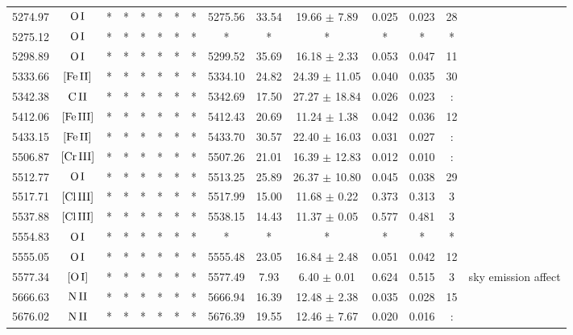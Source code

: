 \documentclass{article}
\begin{document}
\begin{table*}
\begin{adjustbox}{width=\textwidth}
\begin{tabular}{ccccccccccccccc}
5274.97 & $\mbox{O}\thinspace \mbox{I}$ & * & * & * & * & * & * & 5275.56 & 33.54 & 19.66 $\pm$ 7.89 & 0.025 & 0.023 & 28 &  \\
5275.12 & $\mbox{O}\thinspace \mbox{I}$ & * & * & * & * & * & * & * & * & * & * & * & * &  \\
5298.89 & $\mbox{O}\thinspace \mbox{I}$ & * & * & * & * & * & * & 5299.52 & 35.69 & 16.18 $\pm$ 2.33 & 0.053 & 0.047 & 11 &  \\
5333.66 & $\mbox{[Fe}\thinspace \mbox{II]}$ & * & * & * & * & * & * & 5334.10 & 24.82 & 24.39 $\pm$ 11.05 & 0.040 & 0.035 & 30 &  \\
5342.38 & $\mbox{C}\thinspace \mbox{II}$ & * & * & * & * & * & * & 5342.69 & 17.50 & 27.27 $\pm$ 18.84 & 0.026 & 0.023 & : &  \\
5412.06 & $\mbox{[Fe}\thinspace \mbox{III]}$ & * & * & * & * & * & * & 5412.43 & 20.69 & 11.24 $\pm$ 1.38 & 0.042 & 0.036 & 12 &  \\
5433.15 & $\mbox{[Fe}\thinspace \mbox{II]}$ & * & * & * & * & * & * & 5433.70 & 30.57 & 22.40 $\pm$ 16.03 & 0.031 & 0.027 & : &  \\
5506.87 & $\mbox{[Cr}\thinspace \mbox{III]}$ & * & * & * & * & * & * & 5507.26 & 21.01 & 16.39 $\pm$ 12.83 & 0.012 & 0.010 & : &  \\
5512.77 & $\mbox{O}\thinspace \mbox{I}$ & * & * & * & * & * & * & 5513.25 & 25.89 & 26.37 $\pm$ 10.80 & 0.045 & 0.038 & 29 &  \\
5517.71 & $\mbox{[Cl}\thinspace \mbox{III]}$ & * & * & * & * & * & * & 5517.99 & 15.00 & 11.68 $\pm$ 0.22 & 0.373 & 0.313 & 3 &  \\
5537.88 & $\mbox{[Cl}\thinspace \mbox{III]}$ & * & * & * & * & * & * & 5538.15 & 14.43 & 11.37 $\pm$ 0.05 & 0.577 & 0.481 & 3 &  \\
5554.83 & $\mbox{O}\thinspace \mbox{I}$ & * & * & * & * & * & * & * & * & * & * & * & * &  \\
5555.05 & $\mbox{O}\thinspace \mbox{I}$ & * & * & * & * & * & * & 5555.48 & 23.05 & 16.84 $\pm$ 2.48 & 0.051 & 0.042 & 12 &  \\
5577.34 & $\mbox{[O}\thinspace \mbox{I]}$ & * & * & * & * & * & * & 5577.49 & 7.93 & 6.40 $\pm$ 0.01 & 0.624 & 0.515 & 3 &  sky emission affect \\
5666.63 & $\mbox{N}\thinspace \mbox{II}$ & * & * & * & * & * & * & 5666.94 & 16.39 & 12.48 $\pm$ 2.38 & 0.035 & 0.028 & 15 &  \\
5676.02 & $\mbox{N}\thinspace \mbox{II}$ & * & * & * & * & * & * & 5676.39 & 19.55 & 12.46 $\pm$ 7.67 & 0.020 & 0.016 & : &  \\

\end{tabular}
\end{adjustbox}
\end{table*}
\end{document}
